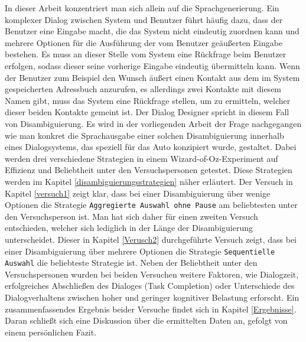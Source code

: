\documentclass[12pt,a4paper]{scrartcl}
\begin{document}
In dieser Arbeit konzentriert man sich allein auf die Sprachgenerierung. Ein komplexer Dialog zwischen System und Benutzer führt häufig dazu, dass der Benutzer eine Eingabe macht, die das System nicht eindeutig zuordnen kann und mehrere Optionen für die Ausführung der vom Benutzer geäußerten Eingabe bestehen. Es muss an dieser Stelle vom System eine Rückfrage beim Benutzer erfolgen, sodass dieser seine vorherige Eingabe eindeutig übermitteln kann. Wenn der Benutzer zum Beispiel den Wunsch äußert einen Kontakt aus dem im System gespeicherten Adressbuch anzurufen, es allerdings zwei Kontakte mit diesem Namen gibt, muss das System eine Rückfrage stellen, um zu ermitteln, welcher dieser beiden Kontakte gemeint ist. Der Dialog Designer spricht in diesem Fall von Disambiguierung.  Es wird in der vorliegenden Arbeit der Frage nachgegangen wie man konkret die Sprachausgabe einer solchen Disambiguierung innerhalb eines Dialogsystems, das speziell für das Auto konzipiert wurde, gestaltet. Dabei werden drei verschiedene Strategien in einem Wizard-of-Oz-Experiment auf Effizienz und Beliebtheit unter den Versuchspersonen getestet. Diese Strategien werden im Kapitel \ref{disambiguierungsstrategien} näher erläutert. Der Versuch in Kapitel \ref{versuch1} zeigt klar, dass bei einer Disambiguierung über wenige Optionen die Strategie \texttt{Aggregierte Auswahl ohne Pause} am beliebtesten unter den Versuchsperson ist. Man hat sich daher für einen zweiten Versuch entschieden, welcher sich lediglich in der Länge der Disambiguierung unterscheidet. Dieser in Kapitel \ref{Verusch2} durchgeführte Versuch zeigt, dass bei einer Disambiguierung über mehrere Optionen die Strategie \texttt{Sequentielle Auswahl} die beliebteste Strategie ist. Neben der Beliebtheit unter den Versuchspersonen wurden bei beiden Versuchen weitere Faktoren, wie Dialogzeit, erfolgreiches Abschließen des Dialoges (Task Completion) oder Unterschiede des Dialogverhaltens zwischen hoher und geringer kognitiver Belastung erforscht. Ein zusammenfassendes Ergebnis beider Versuche findet sich in Kapitel \ref{Ergebnisse}. Daran schließt sich eine Diskussion über die ermittelten Daten an, gefolgt von einem persönlichen Fazit. 

\end{document}
